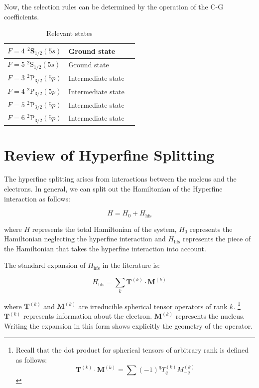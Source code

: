 Now, the selection rules can be determined by the operation of the C-G coefficients. 

\begin{table}[h]
\centering
\begin{tabular}{|l|l|||r|}
\hline
$F=4$ $^2$S$_{1/2} (5s)$ & Ground state  \\ \hline
$F=5$ $^2$S$_{1/2} (5s)$ & Ground state  \\ \hline
$F=3$ $^2$P$_{3/2} (5p)$ & Intermediate state  \\ \hline
$F=4$ $^2$P$_{3/2} (5p)$ & Intermediate state  \\ \hline
$F=5$ $^2$P$_{3/2} (5p)$ & Intermediate state  \\ \hline
$F=6$ $^2$P$_{3/2} (5p)$ & Intermediate state  \\ \hline
\end{tabular}
\caption{Relevant states}
\label{tableOfStates}
\end{table}

\section{Review of Hyperfine Splitting}

The hyperfine splitting arises from interactions between the nucleus and the electrons. In general, we can split out the Hamiltonian of the Hyperfine interaction as follows: 

\begin{equation}
H=H_0+H_{\mathrm{hfs}}
\end{equation}

where $H$ represents the total Hamiltonian of the system, $H_0$ represents the Hamiltonian neglecting the hyperfine interaction and $H_{\mathrm{hfs}}$ represents the piece of the Hamiltonian that takes the hyperfine interaction into account. 

The standard expansion of $H_{\mathrm{hfs}}$ in the literature is:  

\begin{equation}
H_{\mathrm{hfs}}=\sum_k \mathbf{T}^{(k)} \cdot \mathbf{M}^{(k)} \label{hfs_hamiltonian_eqn}
\end{equation}
\cite{schwartz_hyperfine_expansion}
\cite{experimental_hyperfine_alkali_arimondo}
\cite{chinesePhysics}

where $\mathbf{T}^{(k)}$ and $\mathbf{M}^{(k)}$ are irreducible spherical tensor operators of rank $k$.
\footnote{Recall that the dot product for spherical tensors of arbitrary rank is defined as follows:
\begin{equation}\label{TkMk_hyperfine}
\mathbf{T}^{(k)}\cdot\mathbf{M}^{(k)}=\sum (-1)^qT_q^{(k)}M_{-q}^{(k)}
\end{equation}
}
 $\mathbf{T}^{(k)}$ represents information about the electron.
$\mathbf{M}^{(k)}$ represents the nucleus.\cite{experimental_hyperfine_alkali_arimondo}\cite{schwartz_hyperfine_expansion}
\cite{sobelman_spectra}
Writing the expansion in this form shows explicitly the geometry of the operator. 

